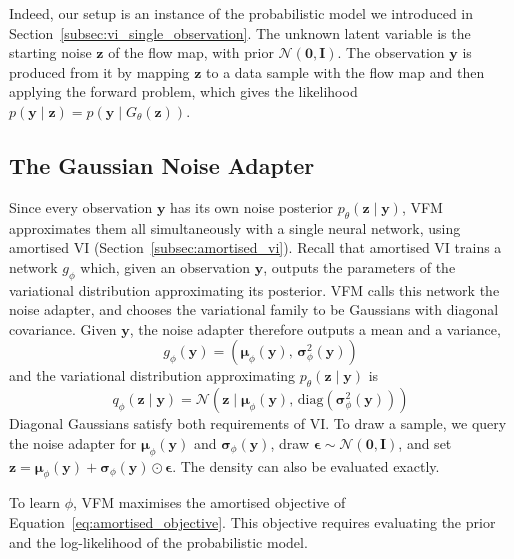 \documentclass[12pt,a4paper]{report}
\begin{document}
Indeed, our setup is an instance of the probabilistic model we introduced in Section~\ref{subsec:vi_single_observation}. The unknown latent variable is the starting noise $\mathbf{z}$ of the flow map, with prior $\mathcal{N}(\mathbf{0},\mathbf{I})$. The observation $\mathbf{y}$ is produced from it by mapping $\mathbf{z}$ to a data sample with the flow map and then applying the forward problem, which gives the likelihood $p(\mathbf{y}\mid\mathbf{z})=p(\mathbf{y}\mid G_{\theta}(\mathbf{z}))$.

\subsection{The Gaussian Noise Adapter}
\label{subsec:vfm_gaussian_adapter}
Since every observation $\mathbf{y}$ has its own noise posterior $p_{\theta}(\mathbf{z}\mid\mathbf{y})$, VFM approximates them all simultaneously with a single neural network, using amortised VI (Section~\ref{subsec:amortised_vi}). Recall that amortised VI trains a network $g_{\phi}$ which, given an observation $\mathbf{y}$, outputs the parameters of the variational distribution approximating its posterior. VFM calls this network the noise adapter, and chooses the variational family to be Gaussians with diagonal covariance. Given $\mathbf{y}$, the noise adapter therefore outputs a mean and a variance,
\begin{equation}
g_{\phi}(\mathbf{y})
=
\left(\boldsymbol{\mu}_{\phi}(\mathbf{y}),\,\boldsymbol{\sigma}^2_{\phi}(\mathbf{y})\right)
\label{eq:noise_adapter}
\end{equation}
and the variational distribution approximating $p_{\theta}(\mathbf{z}\mid\mathbf{y})$ is
\begin{equation}
q_{\phi}(\mathbf{z}\mid\mathbf{y})
=
\mathcal{N}\left(\mathbf{z}\mid\boldsymbol{\mu}_{\phi}(\mathbf{y}),\,\mathrm{diag}\left(\boldsymbol{\sigma}^2_{\phi}(\mathbf{y})\right)\right)
\label{eq:gaussian_adapter}
\end{equation}
Diagonal Gaussians satisfy both requirements of VI. To draw a sample, we query the noise adapter for $\boldsymbol{\mu}_{\phi}(\mathbf{y})$ and $\boldsymbol{\sigma}_{\phi}(\mathbf{y})$, draw $\boldsymbol{\epsilon}\sim\mathcal{N}(\mathbf{0},\mathbf{I})$, and set $\mathbf{z}=\boldsymbol{\mu}_{\phi}(\mathbf{y})+\boldsymbol{\sigma}_{\phi}(\mathbf{y})\odot\boldsymbol{\epsilon}$. The density can also be evaluated exactly.

To learn $\phi$, VFM maximises the amortised objective of Equation~\ref{eq:amortised_objective}. This objective requires evaluating the prior and the log-likelihood of the probabilistic model. 
\end{document}
